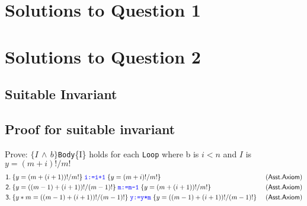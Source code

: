 \documentclass[a4paper,12pt]{article}
\begin{document}
\section{Solutions to Question 1}
% 

\section{Solutions to Question 2}
\subsection{Suitable Invariant}

\subsection{Proof for suitable invariant}
Prove: $\{I\,\land\,b\}$\;\texttt{Body}\;\{I\} holds for each \texttt{Loop} where b is $i < n$ and $I$ is $y=(m+i)!/m!$
\begin{align*}
& \mathsf{1.}\: \{y=(m+(i+1))!/m!\}\;\texttt{\textcolor{blue}{i:=i+1}}\;\{y = (m+i)!/m!\} && \mathsf{(Asst. Axiom)} \\
& \mathsf{2.}\: \{y=((m-1)+(i+1))!/(m-1)!\}\;\texttt{\textcolor{blue}{m:=m-1}}\;\{y = (m+(i+1))!/m!\} && \mathsf{(Asst. Axiom)} \\
& \mathsf{3.}\: \{y*m=((m-1)+(i+1))!/(m-1)!\}\;\texttt{\textcolor{blue}{y:=y*m}}\;\{y=((m-1)+(i+1))!/(m-1)!\}\ && \mathsf{(Asst. Axiom)} \\
\end{align*}
\end{document}
